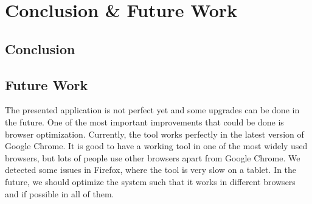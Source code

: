 \chapter{Conclusion \& Future Work}\label{ch:conclusion-future-work}

\section{Conclusion}\label{sec:conclusion}

\section{Future Work}\label{sec:future-work}
The presented application is not perfect yet and some upgrades can be done in the future. One of the most important improvements that could be done is browser optimization. Currently, the tool works perfectly in the latest version of Google Chrome. It is good to have a working tool in one of the most widely used browsers, but lots of people use other browsers apart from Google Chrome. We detected some issues in Firefox, where the tool is very slow on a tablet. In the future, we should optimize the system such that it works in different browsers and if possible in all of them.